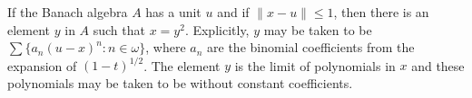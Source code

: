 If the Banach algebra $A$ has a unit $u$ and if $\|x - u\| \leq 1$, then there is an element $y$ in $A$ such that $x = y^2$. Explicitly, $y$ may be taken to be $\sum \{a_n (u - x)^n : n \in \omega\}$, where $a_n$ are the binomial coefficients from the expansion of $(1-t)^{1/2}$. The element $y$ is the limit of polynomials in $x$ and these polynomials may be taken to be without constant coefficients.
